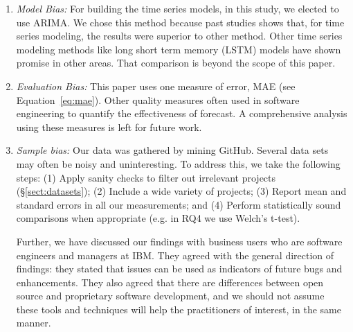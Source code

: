 \documentclass[sigconf, preprint]{acmart}
\newcommand{\be}{\begin{enumerate}}
\newcommand{\ee}{\end{enumerate}}
\newcommand{\tion}[1]{\S\ref{sect:#1}}
\newcommand{\eq}[1]{Equation~\ref{eq:#1}}
\begin{document}
\be[leftmargin=-1pt]
\item[] \textit{Model Bias:} For building the time series models, in this
study, we elected to use ARIMA. We chose this method
because past studies shows that, for time series modeling, the 
results were superior to other method. Other time series modeling
methods like long short term memory (LSTM) models
have shown promise in other areas. That comparison is beyond the scope
of this paper.

\item[] \textit{Evaluation Bias:} 
This paper uses one measure of error, MAE (see \eq{mae}). 
Other quality measures often used in software engineering to quantify
the effectiveness of forecast. A comprehensive analysis using these measures
is left for future work. 
    
\item[] \textit{Sample bias:}
Our data was gathered by mining GitHub. Several data sets may often be noisy and 
uninteresting. To address this, we take the following steps: (1) Apply sanity checks to filter out irrelevant projects (\tion{datasets});
(2) Include a wide variety of projects; (3) Report mean and standard errors in all our measurements; and  
(4) Perform statistically sound comparisons when appropriate (e.g. in RQ4 we use Welch's t-test).

Further, we have discussed our findings with business users who are software engineers and managers at IBM. They agreed with the
general direction of findings: they stated that issues can be used
as indicators of future bugs and enhancements. They also
agreed that there are differences between open source and
proprietary software development, and we should not assume
these tools and techniques will help the practitioners of interest,
in the same manner.
\ee
\end{document}
